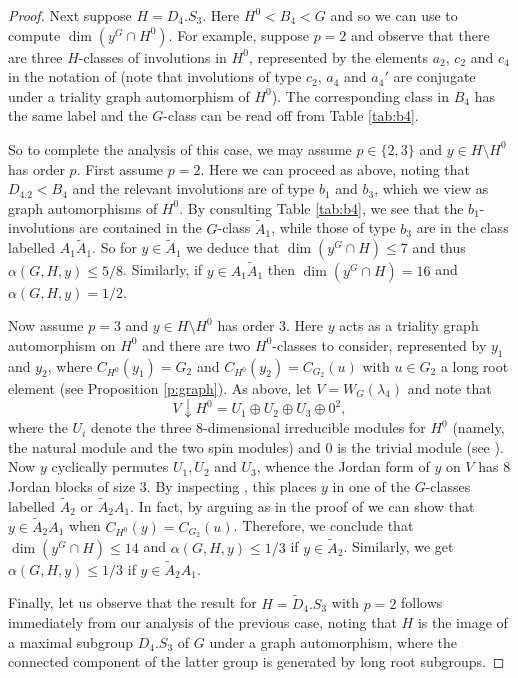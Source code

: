 \documentclass[twoside,a4paper,reqno,11pt]{amsart}
\renewcommand{\a}{\alpha}
\renewcommand{\l}{\lambda}
\newcommand{\<}{\langle}
\renewcommand{\>}{\rangle}
\newcommand{\leqs}{\leqslant}
\renewcommand{\:}{\colon}
\theoremstyle{plain}
\theoremstyle{definition}
\begin{document}
\begin{proof}
Next suppose $H = D_4.S_3$. Here $H^0 < B_4 < G$ and so we can use \cite[Section 4.4]{Law2} to compute $\dim(y^G \cap H^0)$. For example, suppose $p=2$ and observe that there are three $H$-classes of involutions in $H^0$, represented by the elements $a_2$, $c_2$ and $c_4$ in the notation of \cite{AS} (note that involutions of type $c_2$, $a_4$ and $a_4'$ are conjugate under a triality graph automorphism of $H^0$). The corresponding class in $B_4$ has the same label and the $G$-class can be read off from Table \ref{tab:b4}. 

So to complete the analysis of this case, we may assume $p \in \{2,3\}$ and $y \in H \setminus H^0$ has order $p$. First assume $p=2$. Here we can proceed as above, noting that $D_4.2 < B_4$ and the relevant involutions are of type $b_1$ and $b_3$, which we view as graph automorphisms of $H^0$. By consulting Table \ref{tab:b4}, we see that the $b_1$-involutions are contained in the $G$-class $\tilde{A}_1$, while those of type $b_3$ are in the class labelled $A_1\tilde{A}_1$. So for $y \in \tilde{A}_1$ we deduce that $\dim(y^G \cap H) \leqs 7$ and thus $\a(G,H,y) \leqs 5/8$. Similarly, if $y \in A_1\tilde{A}_1$ then $\dim(y^G \cap H) = 16$ and $\a(G,H,y) = 1/2$. 

Now assume $p=3$ and $y \in H \setminus H^0$ has order $3$. Here $y$ acts as a triality graph automorphism on $H^0$ and there are two $H^0$-classes to consider, represented by $y_1$ and $y_2$, where $C_{H^0}(y_1) = G_2$ and $C_{H^0}(y_2) = C_{G_2}(u)$ with $u \in G_2$ a long root element (see  Proposition \ref{p:graph}). As above, let $V = W_G(\l_4)$ and note that  
\[
V\downarrow H^0 = U_1 \oplus U_2 \oplus U_3 \oplus 0^2,
\]
where the $U_i$ denote the three $8$-dimensional irreducible modules for $H^0$ (namely, the natural module and the two spin modules) and $0$ is the trivial module (see \cite[Table 2]{Thomas}). Now $y$ cyclically permutes $U_1,U_2$ and $U_3$, whence  the Jordan form of $y$ on $V$ has $8$ Jordan blocks of size $3$. By inspecting \cite[Table 3]{Law1}, this places $y$ in one of the $G$-classes labelled $\tilde{A}_2$ or $\tilde{A}_2A_1$. In fact, by arguing as in the proof of \cite[Proposition 5.14]{BGS} we can show that $y \in \tilde{A}_2A_1$ when $C_{H^0}(y) = C_{G_2}(u)$. Therefore, we conclude that $\dim(y^G \cap H) \leqs 14$ and $\a(G,H,y) \leqs 1/3$ if $y \in \tilde{A}_2$. Similarly, we get $\a(G,H,y) \leqs 1/3$ if $y \in \tilde{A}_2A_1$.

Finally, let us observe that the result for $H =  \tilde{D}_4.S_3$ with $p=2$ follows immediately from our analysis of the previous case, noting that $H$ is the image of a maximal subgroup $D_4.S_3$ of $G$ under a graph automorphism, where the connected component of the latter group is generated by long root subgroups. 
\end{proof}
\end{document}
